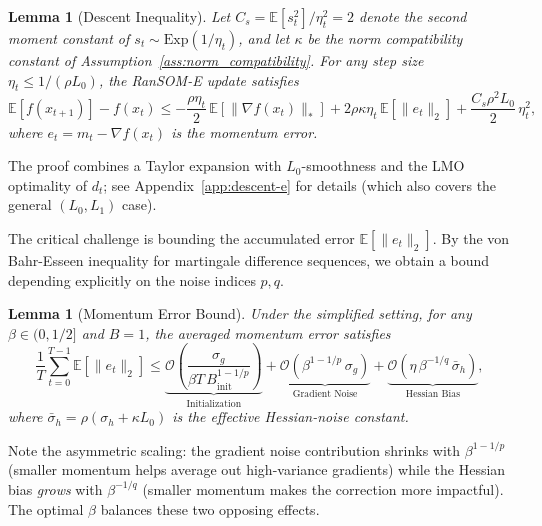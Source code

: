 \documentclass{article}
\theoremstyle{plain}
\newtheorem{lemma}[theorem]{Lemma}
\theoremstyle{definition}
\theoremstyle{remark}
\begin{document}
\begin{lemma}[Descent Inequality]
\label{lemma:main_descent}
Let $C_s = \mathbb{E}[s_t^2]/\eta_t^2 = 2$ denote the second moment
constant of $s_t \sim \mathrm{Exp}(1/\eta_t)$, and let $\kappa$ be the
norm compatibility constant of Assumption~\ref{ass:norm_compatibility}.
For any step size $\eta_t \le 1/(\rho L_0)$, the RanSOM-E update
satisfies
\begin{equation}
\label{eq:main_descent}
    \mathbb{E}[f(x_{t+1})] - f(x_t)
    \le -\frac{\rho \eta_t}{2}\,\mathbb{E}[\|\nabla f(x_t)\|_*]
      + 2\rho\kappa\eta_t\,\mathbb{E}[\|e_t\|_2]
      + \frac{C_s \rho^2 L_0}{2}\,\eta_t^2,
\end{equation}
where $e_t = m_t - \nabla f(x_t)$ is the momentum error.
\end{lemma}
 
\noindent The proof combines a Taylor expansion with $L_0$-smoothness
and the LMO optimality of $d_t$; see Appendix~\ref{app:descent-e} for
details (which also covers the general $(L_0, L_1)$ case).


\noindent The critical challenge is bounding the accumulated error
$\mathbb{E}[\|e_t\|_2]$. By the von Bahr-Esseen inequality for
martingale difference sequences, we obtain a bound depending explicitly
on the noise indices $p, q$.
 
\begin{lemma}[Momentum Error Bound]
\label{lemma:main_error}
Under the simplified setting, for any $\beta \in (0, 1/2]$ and $B = 1$,
the averaged momentum error satisfies
\begin{equation}
\label{eq:main_error}
    \frac{1}{T}\sum_{t=0}^{T-1}\mathbb{E}[\|e_t\|_2]
    \le \underbrace{\mathcal{O}\!\left(\frac{\sigma_g}{\beta T\, B_{\mathrm{init}}^{1-1/p}}\right)}_{\text{Initialization}}
    + \underbrace{\mathcal{O}\!\left(\beta^{1-1/p}\,\sigma_g\right)}_{\text{Gradient Noise}}
    + \underbrace{\mathcal{O}\!\left(\eta\,\beta^{-1/q}\,\bar\sigma_h\right)}_{\text{Hessian Bias}},
\end{equation}
where $\bar\sigma_h = \rho(\sigma_h + \kappa L_0)$ is the effective
Hessian-noise constant.
\end{lemma}
 
\noindent Note the asymmetric scaling: the gradient noise contribution
shrinks with $\beta^{1-1/p}$ (smaller momentum helps average out
high-variance gradients) while the Hessian bias \emph{grows} with
$\beta^{-1/q}$ (smaller momentum makes the correction more impactful).
The optimal $\beta$ balances these two opposing effects.
\end{document}
